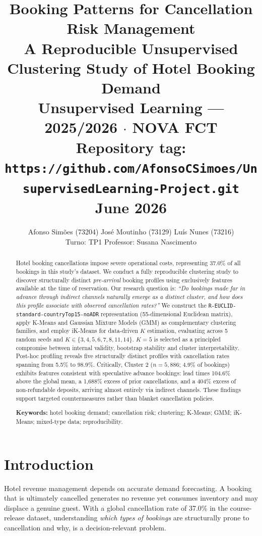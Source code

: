 \documentclass[12pt,a4paper]{article}
\title{%
  \textbf{\Large Booking Patterns for Cancellation Risk Management}\\[0.6em]
  \large A Reproducible Unsupervised Clustering Study of Hotel Booking Demand\\[0.4em]
  \normalsize Unsupervised Learning --- 2025/2026 $\cdot$ NOVA FCT\\[0.2em]
  \normalsize Repository tag: \texttt{https://github.com/AfonsoCSimoes/UnsupervisedLearning-Project.git}\\
  \normalsize June 2026
}
\author{%
  Afonso Simões (73204) \quad José Moutinho (73129) \quad Luís Nunes (73216)\\
  \small Turno: TP1 \quad Professor: Susana Nascimento
}
\date{}
\begin{document}
\maketitle
\thispagestyle{empty}

\begin{abstract}
\noindent
Hotel booking cancellations impose severe operational costs, representing
37.0\% of all bookings in this study's dataset.
We conduct a fully reproducible clustering study to discover structurally distinct \emph{pre-arrival}
booking profiles using exclusively features available at the time of
reservation.
Our research question is: \textit{``Do bookings made far in advance through
indirect channels naturally emerge as a distinct cluster, and how does this
profile associate with observed cancellation rates?''}
We construct the \texttt{R-EUCLID-standard-countryTop15-noADR}
representation (55-dimensional Euclidean matrix), apply K-Means and
Gaussian Mixture Models (GMM) as complementary clustering families,
and employ iK-Means for data-driven $K$ estimation, evaluating
across 5 random seeds and $K \in \{3,4,5,6,7,8,11,14\}$.
$K = 5$ is selected as a principled compromise between internal validity,
bootstrap stability and cluster interpretability.
Post-hoc profiling reveals five structurally distinct profiles with
cancellation rates spanning from 5.5\% to 98.9\%.
Critically, Cluster 2 ($n=5{,}886$; 4.9\% of bookings) exhibits
features consistent with speculative advance bookings: lead times
104.6\% above the global mean, a 1{,}688\% excess of prior
cancellations, and a 404\% excess of non-refundable deposits,
arriving almost entirely via indirect channels.
    These findings support targeted countermeasures rather
than blanket cancellation policies.

\medskip
\noindent\textbf{Keywords:} hotel booking demand; cancellation risk; clustering;
K-Means; GMM; iK-Means; mixed-type data; reproducibility.
\end{abstract}

\newpage
\tableofcontents
\newpage

\section{Introduction}
\label{sec:intro}

Hotel revenue management depends on accurate demand forecasting.
A booking that is ultimately cancelled generates no revenue yet consumes
inventory and may displace a genuine guest.
With a global cancellation rate of 37.0\% in the course-release dataset,
understanding \emph{which types of bookings} are structurally prone to
cancellation and why, is a decision-relevant problem.
\end{document}
